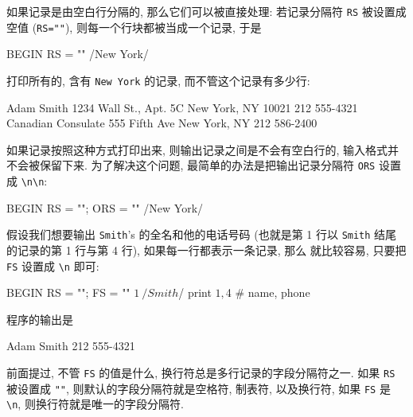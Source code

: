
如果记录是由空白行分隔的, 那么它们可以被直接处理: 若记录分隔符 \verb'RS'
被设置成空值 (\verb'RS=""'), 则每一个行块都被当成一个记录, 于是 
\begin{awkcode}
    BEGIN { RS = "" }
    /New York/
\end{awkcode}
打印所有的, 含有 \verb'New York' 的记录, 而不管这个记录有多少行:
\begin{shell}
    Adam Smith
    1234 Wall St., Apt. 5C
    New York, NY 10021
    212 555-4321
    Canadian Consulate
    555 Fifth Ave
    New York, NY
    212 586-2400
\end{shell}
如果记录按照这种方式打印出来, 则输出记录之间是不会有空白行的, 输入格式并
不会被保留下来. 为了解决这个问题, 最简单的办法是把输出记录分隔符 \verb'ORS'
设置成 \verb'\n\n':
\begin{awkcode}
    BEGIN { RS = ""; ORS = "\n\n" }
    /New York/
\end{awkcode}

假设我们想要输出 \verb'Smith''s 的全名和他的电话号码 (也就是第 1 行以 
\verb'Smith' 结尾的记录的第 1 行与第 4 行), 如果每一行都表示一条记录, 那么 
就比较容易, 只要把 \verb'FS' 设置成 \verb'\n' 即可:
\begin{awkcode}
    BEGIN           { RS = ""; FS = "\n" }
    $1 ~ /Smith$/   { print $1, $4 } # name, phone
\end{awkcode}
程序的输出是 
\begin{shell}
    Adam Smith 212 555-4321
\end{shell}
前面提过, 不管 \verb'FS' 的值是什么, 换行符总是多行记录的字段分隔符之一.
如果 \verb'RS' 被设置成 \verb'""', 则默认的字段分隔符就是空格符, 制表符,
以及换行符, 如果 \verb'FS' 是 \verb'\n', 则换行符就是唯一的字段分隔符.
